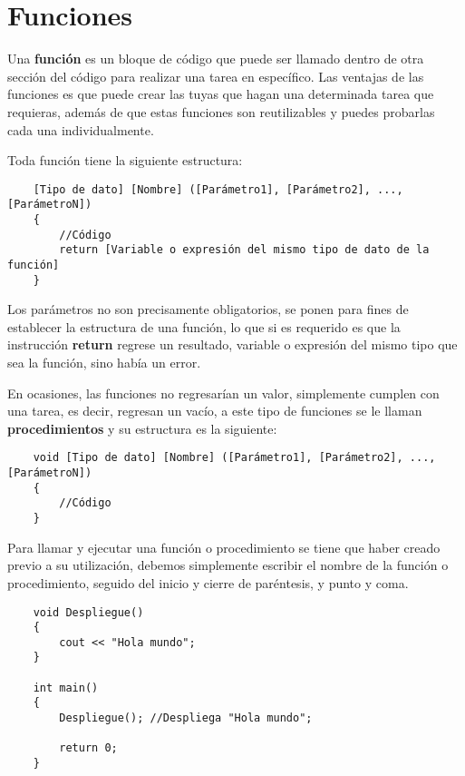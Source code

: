 \section{Funciones}
\hspace{0.55cm}Una \textbf{función} es un bloque de código que puede ser llamado dentro de otra sección del código para realizar una tarea en específico. Las ventajas de las funciones es que puede crear las tuyas que hagan una determinada tarea que requieras, además de que estas funciones son reutilizables y puedes probarlas cada una individualmente.

Toda función tiene la siguiente estructura:
\begin{lstlisting}
    [Tipo de dato] [Nombre] ([Parámetro1], [Parámetro2], ..., [ParámetroN])
    {
        //Código
        return [Variable o expresión del mismo tipo de dato de la función]
    }
\end{lstlisting}

Los parámetros no son precisamente obligatorios, se ponen para fines de establecer la estructura de una función, lo que si es requerido es que la instrucción \textbf{return} regrese un resultado, variable o expresión del mismo tipo que sea la función, sino había un error.

En ocasiones, las funciones no regresarían un valor, simplemente cumplen con una tarea, es decir, regresan un vacío, a este tipo de funciones se le llaman \textbf{procedimientos} y su estructura es la siguiente:
\begin{lstlisting}
    void [Tipo de dato] [Nombre] ([Parámetro1], [Parámetro2], ..., [ParámetroN])
    {
        //Código
    }
\end{lstlisting}

Para llamar y ejecutar una función o procedimiento se tiene que haber creado previo a su utilización, debemos simplemente escribir el nombre de la función o procedimiento, seguido del inicio y cierre de paréntesis, y punto y coma.
\begin{lstlisting}
    void Despliegue()
    {
        cout << "Hola mundo";
    }
    
    int main()
    {
        Despliegue(); //Despliega "Hola mundo";
        
        return 0;
    }
\end{lstlisting}

